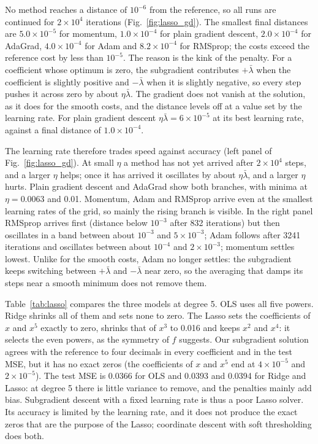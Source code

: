 \documentclass[aps,reprint,amsmath,amssymb,nofootinbib,floatfix]{revtex4-2}
\newcommand{\lb}{\bar\lambda}
\begin{document}
No method reaches a distance of $10^{-6}$ from the reference, so all runs are continued for
$2\times10^{4}$ iterations (Fig.~\ref{fig:lasso_gd}). The smallest final distances are
$5.0\times10^{-5}$ for momentum, $1.0\times10^{-4}$ for plain gradient descent,
$2.0\times10^{-4}$ for AdaGrad, $4.0\times10^{-4}$ for Adam and $8.2\times10^{-4}$ for RMSprop;
the costs exceed the reference cost by less than $10^{-5}$. The reason is the kink of the
penalty. For a coefficient whose optimum is zero, the subgradient contributes $+\lb$ when the
coefficient is slightly positive and $-\lb$ when it is slightly negative, so every step pushes it
across zero by about $\eta\lb$. The gradient does not vanish at the solution, as it does for the
smooth costs, and the distance levels off at a value set by the learning rate. For plain gradient
descent $\eta\lb=6\times10^{-5}$ at its best learning rate, against a final distance of
$1.0\times10^{-4}$.

The learning rate therefore trades speed against accuracy (left panel of
Fig.~\ref{fig:lasso_gd}). At small $\eta$ a method has not yet arrived after $2\times10^{4}$
steps, and a larger $\eta$ helps; once it has arrived it oscillates by about $\eta\lb$, and a
larger $\eta$ hurts. Plain gradient descent and AdaGrad show both branches, with minima at
$\eta=0.0063$ and 0.01. Momentum, Adam and RMSprop arrive even at the smallest learning rates of
the grid, so mainly the rising branch is visible. In the right panel RMSprop arrives first
(distance below $10^{-3}$ after 832 iterations) but then oscillates in a band between about
$10^{-3}$ and $5\times10^{-3}$; Adam follows after 3241 iterations and oscillates between about
$10^{-4}$ and $2\times10^{-3}$; momentum settles lowest. Unlike for the smooth costs, Adam no
longer settles: the subgradient keeps switching between $+\lb$ and $-\lb$ near zero, so the
averaging that damps its steps near a smooth minimum does not remove them.

Table~\ref{tab:lasso} compares the three models at degree 5. OLS uses all five powers. Ridge
shrinks all of them and sets none to zero. The Lasso sets the coefficients of $x$ and $x^5$
exactly to zero, shrinks that of $x^3$ to 0.016 and keeps $x^2$ and $x^4$: it selects the even
powers, as the symmetry of $f$ suggests. Our subgradient solution agrees with the reference to
four decimals in every coefficient and in the test MSE, but it has no exact zeros (the
coefficients of $x$ and $x^5$ end at $4\times10^{-5}$ and $2\times10^{-5}$). The test MSE is
0.0366 for OLS and 0.0393 and 0.0394 for Ridge and Lasso: at degree 5 there is little variance to
remove, and the penalties mainly add bias. Subgradient descent with a fixed learning rate is thus
a poor Lasso solver. Its accuracy is limited by the learning rate, and it does not produce the
exact zeros that are the purpose of the Lasso; coordinate descent with soft thresholding does
both.
\end{document}
